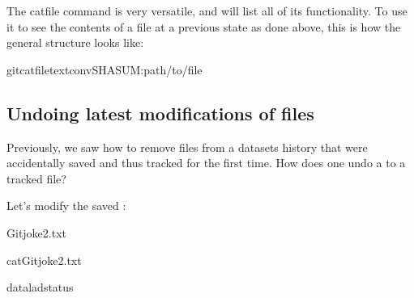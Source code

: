 \ignorespaces 
\sphinxAtStartPar
The cat\sphinxhyphen{}file command is very versatile, and
 will list all
of its functionality. To use it to see the contents of a file at a previous
state as done above, this is how the general structure looks like:

\begin{sphinxVerbatim}[commandchars=\\\{\}]
gitcat\PYGZhy{}file\PYGZhy{}\PYGZhy{}textconvSHASUM:\PYGZlt{}path/to/file\PYGZgt{}
\end{sphinxVerbatim}


\subsection{Undoing latest modifications of files}
\label{\detokenize{basics/101-137-history:undoing-latest-modifications-of-files}}
\sphinxAtStartPar
Previously, we saw how to remove files from a datasets history that
were accidentally saved and thus tracked for the first time.
How does one undo a  to a tracked file?

\sphinxAtStartPar
Let’s modify the saved :

\begin{sphinxVerbatim}[commandchars=\\\{\}]
\PYGZgt{}\PYGZgt{}Gitjoke2.txt
\end{sphinxVerbatim}

\begin{sphinxVerbatim}[commandchars=\\\{\}]
catGitjoke2.txt
\end{sphinxVerbatim}

\begin{sphinxVerbatim}[commandchars=\\\{\}]
dataladstatus
\end{sphinxVerbatim}

